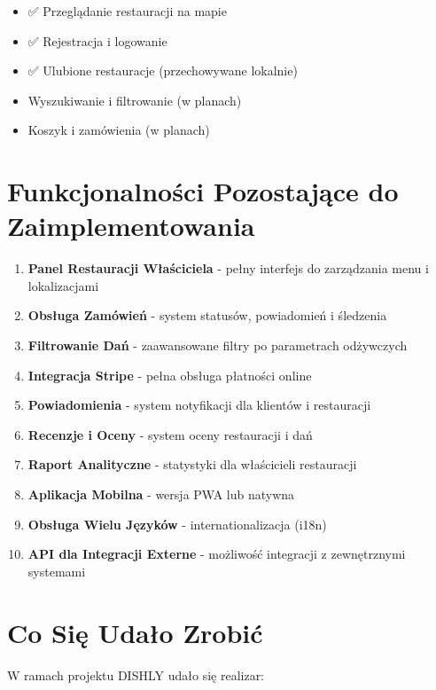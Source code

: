 \documentclass[12pt,a4paper,utf-8]{article}
\begin{document}
\begin{itemize}
    \item ✅ Przeglądanie restauracji na mapie
    \item ✅ Rejestracja i logowanie
    \item ✅ Ulubione restauracje (przechowywane lokalnie)
    \item Wyszukiwanie i filtrowanie (w planach)
    \item Koszyk i zamówienia (w planach)
\end{itemize}

\section{Funkcjonalności Pozostające do Zaimplementowania}

\begin{enumerate}
    \item \textbf{Panel Restauracji Właściciela}  -  pełny interfejs do zarządzania menu i lokalizacjami
    \item \textbf{Obsługa Zamówień}  -  system statusów, powiadomień i śledzenia
    \item \textbf{Filtrowanie Dań}  -  zaawansowane filtry po parametrach odżywczych
    \item \textbf{Integracja Stripe}  -  pełna obsługa płatności online
    \item \textbf{Powiadomienia}  -  system notyfikacji dla klientów i restauracji
    \item \textbf{Recenzje i Oceny}  -  system oceny restauracji i dań
    \item \textbf{Raport Analityczne}  -  statystyki dla właścicieli restauracji
    \item \textbf{Aplikacja Mobilna}  -  wersja PWA lub natywna
    \item \textbf{Obsługa Wielu Języków}  -  internationalizacja (i18n)
    \item \textbf{API dla Integracji Externe}  -  możliwość integracji z zewnętrznymi systemami
\end{enumerate}

\section{Co Się Udało Zrobić}

W ramach projektu DISHLY udało się realizar:
\end{document}
